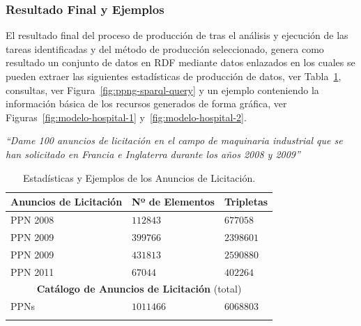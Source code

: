 % 
\subsubsection{Resultado Final y Ejemplos}
El resultado final del proceso de producción de \linkeddata tras el análisis y ejecución 
de las tareas identificadas y del método de producción seleccionado, genera como resultado un conjunto de 
datos en \gls{RDF} mediante datos enlazados en los cuales se pueden extraer las siguientes 
estadísticas de producción de datos, ver Tabla~\ref{table:ppn-ejemplos}, consultas, ver Figura~\ref{fig:ppng-sparql-query} y un 
ejemplo conteniendo la información básica de los recursos generados de forma gráfica, ver Figuras~\ref{fig:modelo-hospital-1} y~\ref{fig:modelo-hospital-2}. 

\begin{Frame}
 \textit{``Dame 100 anuncios de licitación en el campo de maquinaria industrial que se han solicitado 
en Francia e Inglaterra durante los años 2008 y 2009''}
\end{Frame}
% 
% 
\begin{longtable}[c]{|p{4cm}|p{4cm}|p{3cm}|} 
\hline
  \textbf{Anuncios de Licitación} & \textbf{Nº de Elementos}  &  \textbf{Tripletas}  \\\hline
\endhead
PPN 2008 & $112843$  &   $677058$  \\ \hline
PPN 2009 & $399766$ &   $2398601$   \\ \hline
PPN 2009  & $431813$&  $2590880$  \\ \hline
PPN 2011 & $67044$&   $402264$   \\ \hline
\multicolumn{3}{|c|}{\textbf{Catálogo de Anuncios de Licitación} (total)} \\ \hline
PPNs & $1011466$ &  $6068803$   \\ \hline
\hline
\caption{Estadísticas y Ejemplos de los Anuncios de Licitación.}\label{table:ppn-ejemplos}\\    
\end{longtable}

